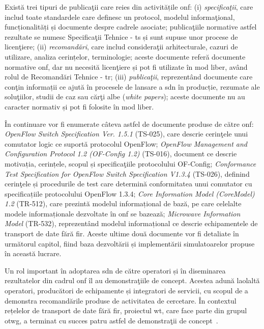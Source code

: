 Există trei tipuri de publicaţii care reies din activitățile \gls{onf}: (i) \textit{specificaţii}, care includ toate standardele care definesc un protocol, modelul informaţional, funcționalități și documente despre cadrele asociate; publicaţiile normative astfel rezultate se numesc Specificaţii Tehnice - \gls{ts} și sunt supuse unor procese de licenţiere; (ii) \textit{recomandări}, care includ consideraţii arhitecturale, cazuri de utilizare, analiza cerințelor, terminologie; aceste documente referă documente normative \gls{onf}, dar nu necesită licenţiere și pot fi utilizate în mod liber, având rolul de Recomandări Tehnice - \gls{tr}; (iii) \textit{publicaţii}, reprezentând documente care conţin informații ce ajută în procesele de lansare a \gls{sdn} în producție, rezumate ale soluţiilor, studii de caz sau cărţi albe (\textit{white papers}); aceste documente nu au caracter normativ și pot fi folosite în mod liber.

În continuare vor fi enumerate câteva astfel de documente produse de către \gls{onf}: \textit{OpenFlow Switch Specification Ver. 1.5.1} (TS-025), care descrie cerinţele unui comutator logic ce suportă protocolul OpenFlow; \textit{OpenFlow Management and	Configuration Protocol 1.2 (OF-Config 1.2)} (TS-016), document ce descrie motivația, cerințele, scopul și specificaţiile protocolului OF-Config; \textit{Conformance Test Specification for OpenFlow Switch Specification V1.3.4} (TS-026), definind cerinţele și procedurile de test care determină conformitatea unui comutator cu specificațiile protocolului OpenFlow 1.3.4; \textit{Core Information Model (CoreModel) 1.2} (TR-512), care prezintă modelul informațional de bază, pe care celelalte modele informaționale dezvoltate în \gls{onf} se bazează; \textit{Microwave Information Model} (TR-532), reprezentând modelul informațional ce descrie echipamentele de transport de date fără fir. Aceste ultime două documente vor fi detaliate în următorul capitol, fiind baza dezvoltării și implementării simulatoarelor propuse în această lucrare.

Un rol important în adoptarea \gls{sdn} de către operatori și în diseminarea rezultatelor din cadrul \gls{onf} îl au demonstraţiile de concept. Acestea adună laolaltă operatori, producători de echipamente și integratori de servicii, cu scopul de a demonstra recomandările produse de activitatea de cercetare. În contextul rețelelor de transport de date fără fir, proiectul \gls{wt}, care face parte din grupul \gls{otwg}, a terminat cu succes patru astfel de demonstraţii de concept~\cite{onf2015_poc1, onf2016_poc2, onf2016_poc3, onf2017_poc4}.

